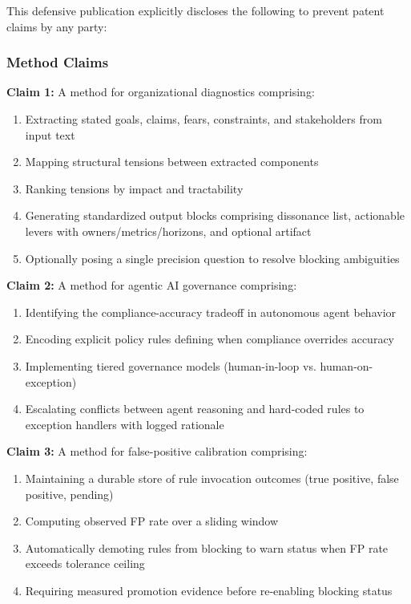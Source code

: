 \documentclass[11pt,a4paper]{article}
\begin{document}
This defensive publication explicitly discloses the following to prevent patent claims by any party:

\subsubsection{Method Claims}

\textbf{Claim 1:} A method for organizational diagnostics comprising:
\begin{enumerate}
\item Extracting stated goals, claims, fears, constraints, and stakeholders from input text
\item Mapping structural tensions between extracted components
\item Ranking tensions by impact and tractability
\item Generating standardized output blocks comprising dissonance list, actionable levers with owners/metrics/horizons, and optional artifact
\item Optionally posing a single precision question to resolve blocking ambiguities
\end{enumerate}

\textbf{Claim 2:} A method for agentic AI governance comprising:
\begin{enumerate}
\item Identifying the compliance-accuracy tradeoff in autonomous agent behavior
\item Encoding explicit policy rules defining when compliance overrides accuracy
\item Implementing tiered governance models (human-in-loop vs. human-on-exception)
\item Escalating conflicts between agent reasoning and hard-coded rules to exception handlers with logged rationale
\end{enumerate}

\textbf{Claim 3:} A method for false-positive calibration comprising:
\begin{enumerate}
\item Maintaining a durable store of rule invocation outcomes (true positive, false positive, pending)
\item Computing observed FP rate over a sliding window
\item Automatically demoting rules from blocking to warn status when FP rate exceeds tolerance ceiling
\item Requiring measured promotion evidence before re-enabling blocking status
\end{enumerate}
\end{document}
